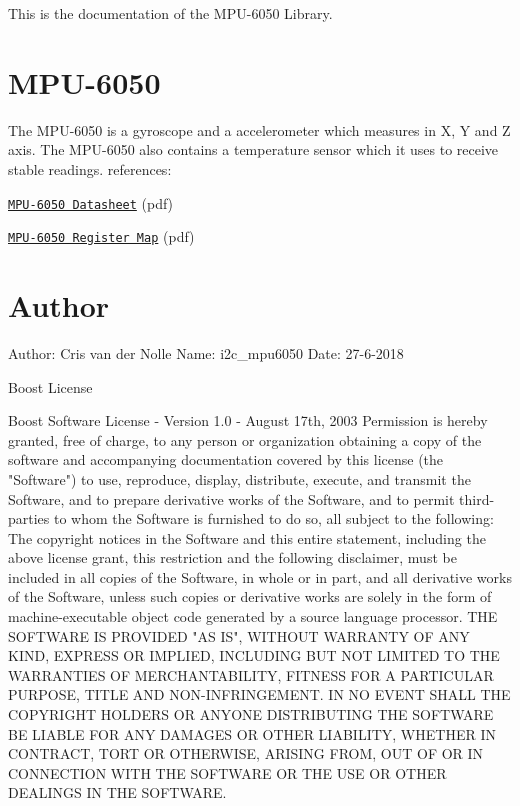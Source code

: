This is the documentation of the M\+P\+U-\/6050 Library. \hypertarget{index_MPU-6050}{}\section{M\+P\+U-\/6050}\label{index_MPU-6050}
The M\+P\+U-\/6050 is a gyroscope and a accelerometer which measures in X, Y and Z axis. The M\+P\+U-\/6050 also contains a temperature sensor which it uses to receive stable readings.  references\+:
\begin{DoxyItemize}
\item \href{https://www.invensense.com/wp-content/uploads/2015/02/MPU-6000-Datasheet1.pdf}{\tt M\+P\+U-\/6050 Datasheet} (pdf)
\item \href{https://www.invensense.com/wp-content/uploads/2015/02/MPU-6000-Register-Map1.pdf}{\tt M\+P\+U-\/6050 Register Map} (pdf) 
\end{DoxyItemize}\hypertarget{index_Boost}{}\section{Author}\label{index_Boost}
\begin{DoxyVerb}Author: Cris van der Nolle
Name: i2c_mpu6050
Date: 27-6-2018
\end{DoxyVerb}
  Boost License \begin{DoxyVerb}Boost Software License - Version 1.0 - August 17th, 2003
Permission is hereby granted, free of charge, to any person or organization
obtaining a copy of the software and accompanying documentation covered by
this license (the "Software") to use, reproduce, display, distribute,
execute, and transmit the Software, and to prepare derivative works of the
Software, and to permit third-parties to whom the Software is furnished to
do so, all subject to the following:
The copyright notices in the Software and this entire statement, including
the above license grant, this restriction and the following disclaimer,
must be included in all copies of the Software, in whole or in part, and
all derivative works of the Software, unless such copies or derivative
works are solely in the form of machine-executable object code generated by
a source language processor.
THE SOFTWARE IS PROVIDED "AS IS", WITHOUT WARRANTY OF ANY KIND, EXPRESS OR
IMPLIED, INCLUDING BUT NOT LIMITED TO THE WARRANTIES OF MERCHANTABILITY,
FITNESS FOR A PARTICULAR PURPOSE, TITLE AND NON-INFRINGEMENT. IN NO EVENT
SHALL THE COPYRIGHT HOLDERS OR ANYONE DISTRIBUTING THE SOFTWARE BE LIABLE
FOR ANY DAMAGES OR OTHER LIABILITY, WHETHER IN CONTRACT, TORT OR OTHERWISE,
ARISING FROM, OUT OF OR IN CONNECTION WITH THE SOFTWARE OR THE USE OR OTHER
DEALINGS IN THE SOFTWARE.  \end{DoxyVerb}
 